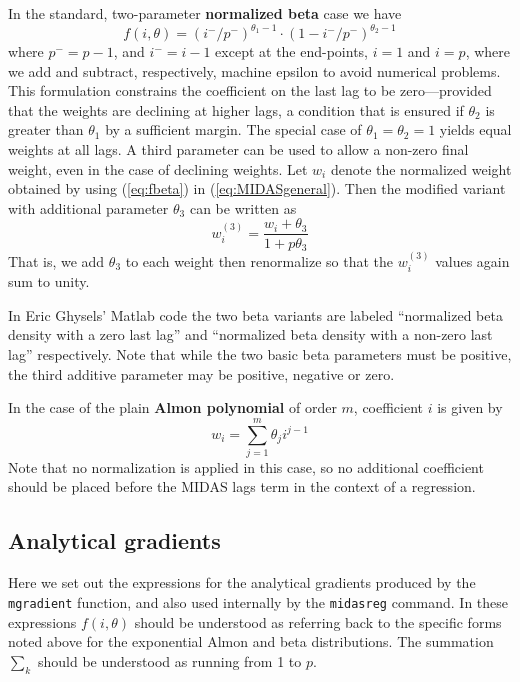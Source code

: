 In the standard, two-parameter \textbf{normalized beta} case we have
\begin{equation}
\label{eq:fbeta}
  f(i, \theta) = (i^-/p^-)^{\theta_1-1} \cdot (1-i^-/p^-)^{\theta_2-1}
\end{equation}
where $p^- = p-1$, and $i^- = i-1$ except at the end-points, $i=1$ and
$i=p$, where we add and subtract, respectively, machine epsilon to
avoid numerical problems.  This formulation constrains the coefficient
on the last lag to be zero---provided that the weights are declining
at higher lags, a condition that is ensured if $\theta_2$ is greater
than $\theta_1$ by a sufficient margin. The special case of
$\theta_1 = \theta_2 = 1$ yields equal weights at all lags. A third
parameter can be used to allow a non-zero final weight, even in the
case of declining weights.  Let $w_i$ denote the normalized weight
obtained by using (\ref{eq:fbeta}) in (\ref{eq:MIDASgeneral}). Then the
modified variant with additional parameter $\theta_3$ can be written
as
\[
w^{(3)}_i = \frac{w_i + \theta_3}{1 + p\theta_3}
\]
That is, we add $\theta_3$ to each weight then renormalize so that the
$w^{(3)}_i$ values again sum to unity.

In Eric Ghysels' Matlab code the two beta variants are labeled
``normalized beta density with a zero last lag'' and ``normalized beta
density with a non-zero last lag'' respectively.  Note that while the
two basic beta parameters must be positive, the third additive
parameter may be positive, negative or zero.

\vspace{1ex}

In the case of the plain \textbf{Almon polynomial} of order $m$,
coefficient $i$ is given by
\[
w_i = \sum_{j=1}^m \theta_j i^{j-1}
\]
Note that no normalization is applied in this case, so no additional
coefficient should be placed before the MIDAS lags term in the context
of a regression.

\subsection*{Analytical gradients}

Here we set out the expressions for the analytical gradients produced
by the \texttt{mgradient} function, and also used internally by the
\texttt{midasreg} command. In these expressions $f(i,\theta)$ should
be understood as referring back to the specific forms noted above
for the exponential Almon and beta distributions. The summation
$\sum_k$ should be understood as running from 1 to $p$.

